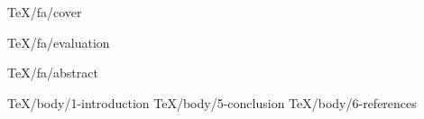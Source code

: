 \documentclass [
	a4paper, %
	12pt, %
	oneside %
] {report} %
\begin{document}
	
	 {TeX/fa/cover}
	
	
	 {TeX/fa/evaluation}
	
	
	
	 {TeX/fa/abstract}

	\tableofcontents
	

	
	 {TeX/body/1-introduction}
	 {TeX/body/5-conclusion}
	 {TeX/body/6-references}
	
		
\end{document}
